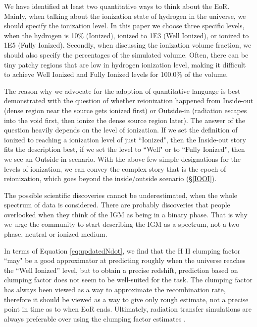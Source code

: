 We have identified at least two quantitative ways to think about the EoR.  Mainly, when talking about the ionization state of hydrogen in the universe, we should specify the ionization level.  In this paper we choose three specific levels, when the hydrogen is 10\% (Ionized), ionized to 1E3 (Well Ionized), or ionized to 1E5 (Fully Ionized).  Secondly, when discussing the ionization volume fraction, we should also specify the percentages of the simulated volume. Often, there can be tiny patchy regions that are low in hydrogen ionization level, making it difficult to achieve  Well Ionized and Fully Ionized levels for 100.0\% of the volume.

The reason why we advocate for the adoption of quantitative language is best demonstrated with the question of whether reionization happened from Inside-out (dense region near the source gets ionized first) or Outside-in (radiation escapes into the void first, then ionize the dense source
region later).  The answer of the question heavily depends on the level of ionization.  If we set the definition of ionized to reaching a ionization level of just ``Ionized", then the Inside-out story fits the description best, if we set the level to ``Well" or to ``Fully Ionized", then we see an Outside-in scenario.  With the above few simple designations for the levels of ionization, we can convey the complex story that is the epoch of reionization, which goes beyond the inside/outside scenario (\S\ref{IOOI}).

The possible scientific discoveries cannot be underestimated, when the whole spectrum of data is considered.  There are probably discoveries that people overlooked when they think of the IGM as being in a binary phase.  That is why we urge the community to start describing the IGM as a spectrum, not a two phase, neutral or ionized medium.

In terms of Equation \eqref{eq:updatedNdot}, we find that the H {\footnotesize II} clumping factor ``may" be a good approximator at predicting roughly when the universe reaches the ``Well Ionized'' level, but to obtain a precise redshift, prediction based on clumping factor does not seem to be well-suited for the task.  The clumping factor has always been viewed as a way to approximate the recombination rate, therefore it should be viewed as a way to give only rough estimate, not a precise point in time as to when EoR ends.  Ultimately, radiation transfer simulations are always preferable over using the clumping factor estimates \citep{RaicevicTheuns2011}.  


